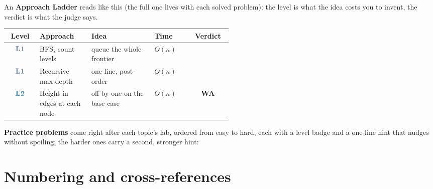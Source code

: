 
\medskip
An \textbf{Approach Ladder} reads like this (the full one lives with each solved
problem): the level is what the idea costs you to invent, the verdict is what
the judge says.

\begin{center}
\renewcommand{\arraystretch}{1.3}
\begin{tabular}{@{}c p{0.235\linewidth} p{0.28\linewidth} l c@{}}
\toprule
\textbf{Level} & \textbf{Approach} & \textbf{Idea} & \textbf{Time} & \textbf{Verdict} \\
\midrule
$\lv1$ & BFS, count levels & queue the whole frontier & $O(n)$ & \ac \\
$\lv1$ & Recursive max-depth & one line, post-order & $O(n)$ & \ac \\
$\lv2$ & Height in edges at each node & off-by-one on the base case & $O(n)$ & {\colorbox{warningred!12}{\textcolor{warningred}{\scriptsize\bfseries WA}}} \\
\bottomrule
\end{tabular}
\end{center}

\medskip
\textbf{Practice problems} come right after each topic's lab, ordered from easy
to hard, each with a level badge and a one-line hint that nudges without
spoiling; the harder ones carry a second, stronger hint:

\begin{practiceset}
\end{practiceset}

\section*{Numbering and cross-references}

